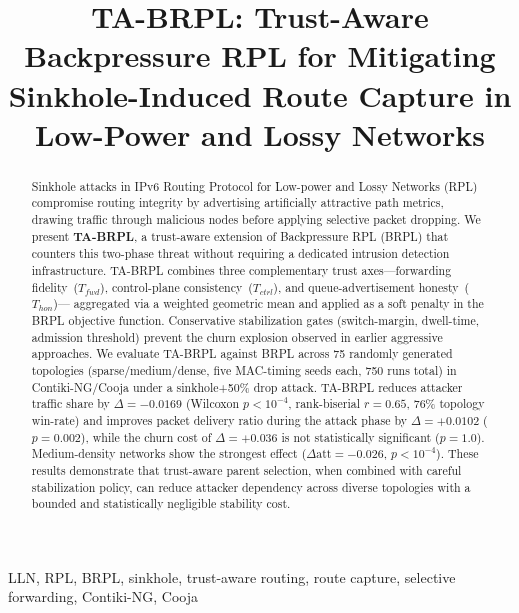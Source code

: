 \documentclass[conference]{IEEEtran}
\begin{document}
\title{TA-BRPL: Trust-Aware Backpressure RPL for Mitigating Sinkhole-Induced Route Capture in Low-Power and Lossy Networks}

\author{%
}

\maketitle

\begin{abstract}
Sinkhole attacks in IPv6 Routing Protocol for Low-power and Lossy Networks (RPL)
compromise routing integrity by advertising artificially attractive path metrics,
drawing traffic through malicious nodes before applying selective packet dropping.
We present \textbf{TA-BRPL}, a trust-aware extension of Backpressure RPL (BRPL)
that counters this two-phase threat without requiring a dedicated intrusion
detection infrastructure.
TA-BRPL combines three complementary trust axes---forwarding fidelity~($T_{fwd}$),
control-plane consistency~($T_{ctrl}$), and queue-advertisement honesty~($T_{hon}$)---%
aggregated via a weighted geometric mean and applied as a soft penalty in the BRPL
objective function.
Conservative stabilization gates (switch-margin, dwell-time, admission threshold)
prevent the churn explosion observed in earlier aggressive approaches.
We evaluate TA-BRPL against BRPL across 75 randomly generated topologies
(sparse/medium/dense, five MAC-timing seeds each, 750 runs total)
in Contiki-NG/Cooja under a sinkhole+50\% drop attack.
TA-BRPL reduces attacker traffic share by $\Delta = -0.0169$
(Wilcoxon $p < 10^{-4}$, rank-biserial $r = 0.65$, 76\% topology win-rate)
and improves packet delivery ratio during the attack phase by $\Delta = +0.0102$
($p = 0.002$),
while the churn cost of $\Delta = +0.036$ is not statistically significant
($p = 1.0$).
Medium-density networks show the strongest effect
($\Delta\text{att} = -0.026$, $p < 10^{-4}$).
These results demonstrate that trust-aware parent selection,
when combined with careful stabilization policy,
can reduce attacker dependency across diverse topologies
with a bounded and statistically negligible stability cost.
\end{abstract}

\begin{IEEEkeywords}
LLN, RPL, BRPL, sinkhole, trust-aware routing, route capture,
selective forwarding, Contiki-NG, Cooja
\end{IEEEkeywords}
\end{document}
